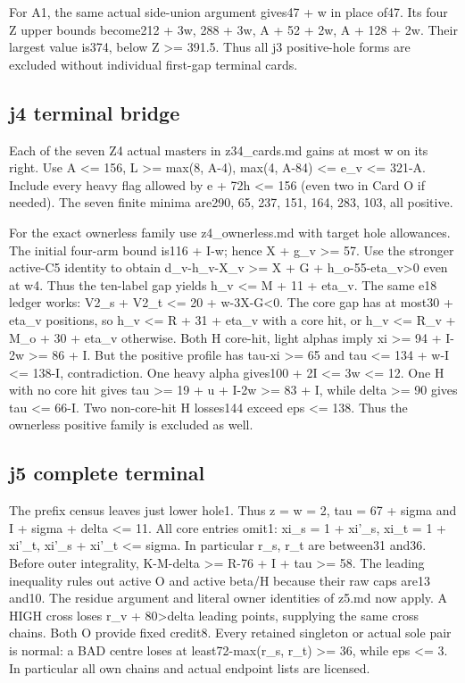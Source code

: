 \documentclass[11pt,a4paper]{article}
\begin{document}
For A1, the same actual side-union argument gives47 + w in place of47.
Its four Z upper bounds become212 + 3w, 288 + 3w, A + 52 + 2w, A + 128 +
2w. Their largest value is374, below Z \textgreater= 391.5. Thus all j3
positive-hole forms are excluded without individual first-gap terminal
cards.

\hypertarget{j4-terminal-bridge}{%
\subsection{j4 terminal bridge}\label{j4-terminal-bridge}}

Each of the seven Z4 actual masters in z34\_cards.md gains at most w on
its right. Use A \textless= 156, L \textgreater= max(8, A-4), max(4,
A-84) \textless= e\_v \textless= 321-A. Include every heavy flag allowed
by e + 72h \textless= 156 (even two in Card O if needed). The seven
finite minima are290, 65, 237, 151, 164, 283, 103, all positive.

For the exact ownerless family use z4\_ownerless.md with target hole
allowances. The initial four-arm bound is116 + I-w; hence X + g\_v
\textgreater= 57. Use the stronger active-C5 identity to obtain
d\_v-h\_v-X\_v \textgreater= X + G + h\_o-55-eta\_v\textgreater0 even at
w4. Thus the ten-label gap yields h\_v \textless= M + 11 + eta\_v. The
same e18 ledger works: V2\_s + V2\_t \textless= 20 + w-3X-G\textless0.
The core gap has at most30 + eta\_v positions, so h\_v \textless= R + 31
+ eta\_v with a core hit, or h\_v \textless= R\_v + M\_o + 30 + eta\_v
otherwise. Both H core-hit, light alphas imply xi \textgreater= 94 +
I-2w \textgreater= 86 + I. But the positive profile has tau-xi
\textgreater= 65 and tau \textless= 134 + w-I \textless= 138-I,
contradiction. One heavy alpha gives100 + 2I \textless= 3w \textless=
12. One H with no core hit gives tau \textgreater= 19 + u + I-2w
\textgreater= 83 + I, while delta \textgreater= 90 gives tau \textless=
66-I. Two non-core-hit H losses144 exceed eps \textless= 138. Thus the
ownerless positive family is excluded as well.

\hypertarget{j5-complete-terminal}{%
\subsection{j5 complete terminal}\label{j5-complete-terminal}}

The prefix census leaves just lower hole1. Thus z = w = 2, tau = 67 +
sigma and I + sigma + delta \textless= 11. All core entries omit1: xi\_s
= 1 + xi'\_s, xi\_t = 1 + xi'\_t, xi'\_s + xi'\_t \textless= sigma. In
particular r\_s, r\_t are between31 and36. Before outer integrality,
K-M-delta \textgreater= R-76 + I + tau \textgreater= 58. The leading
inequality rules out active O and active beta/H because their raw caps
are13 and10. The residue argument and literal owner identities of z5.md
now apply. A HIGH cross loses r\_v + 80\textgreater delta leading
points, supplying the same cross chains. Both O provide fixed credit8.
Every retained singleton or actual sole pair is normal: a BAD centre
loses at least72-max(r\_s, r\_t) \textgreater= 36, while eps \textless=
3. In particular all own chains and actual endpoint lists are licensed.
\end{document}
